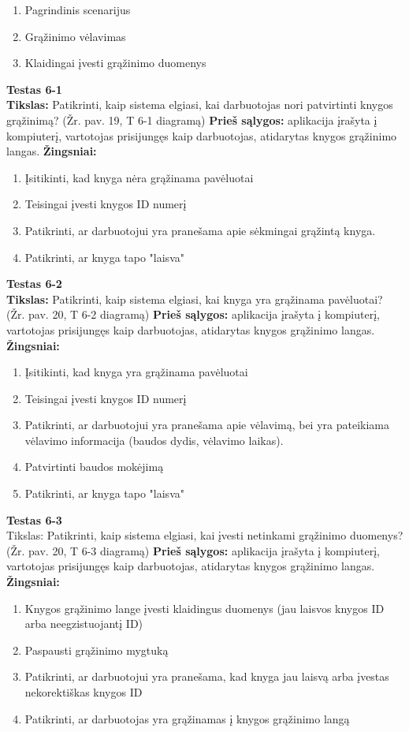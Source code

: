 \documentclass{VUMIFPSkursinis}
\begin{document}
\begin{enumerate}
\item Pagrindinis scenarijus
\item Grąžinimo vėlavimas
\item Klaidingai įvesti grąžinimo duomenys
\end{enumerate}
\hfill \break
\textbf{Testas 6-1}\\
\hfill \break
\textbf{Tikslas:} Patikrinti, kaip sistema elgiasi, kai darbuotojas nori patvirtinti knygos grąžinimą? (Žr. pav. 19, T 6-1 diagramą)
\hfill \break
\hfill \break
\textbf{Prieš sąlygos:} aplikacija įrašyta į kompiuterį, vartotojas prisijungęs kaip darbuotojas, atidarytas knygos grąžinimo langas.
\hfill \break
\hfill \break
\textbf{Žingsniai:}
\hfill \break
\begin{enumerate}
\item Įsitikinti, kad knyga nėra grąžinama pavėluotai
\item Teisingai įvesti knygos ID numerį
\item Patikrinti, ar darbuotojui yra pranešama apie sėkmingai grąžintą knyga.
\item Patikrinti, ar knyga tapo "laisva"
\end{enumerate}
\hfill \break
\textbf{Testas 6-2}\\
\hfill \break
\textbf{Tikslas:} Patikrinti, kaip sistema elgiasi, kai knyga yra grąžinama pavėluotai? (Žr. pav. 20, T 6-2 diagramą)
\hfill \break
\hfill \break
\textbf{Prieš sąlygos:} aplikacija įrašyta į kompiuterį, vartotojas prisijungęs kaip darbuotojas, atidarytas knygos grąžinimo langas.
\hfill \break
\hfill \break
\textbf{Žingsniai:}
\hfill \break
\begin{enumerate}
\item Įsitikinti, kad knyga yra grąžinama pavėluotai
\item Teisingai įvesti knygos ID numerį
\item Patikrinti, ar darbuotojui yra pranešama apie vėlavimą, bei yra pateikiama vėlavimo informacija (baudos dydis, vėlavimo laikas).
\item Patvirtinti baudos mokėjimą
\item Patikrinti, ar knyga tapo "laisva"
\end{enumerate}
\hfill \break
\textbf{Testas 6-3}\\
\hfill \break
Tikslas: Patikrinti, kaip sistema elgiasi, kai įvesti netinkami grąžinimo duomenys? (Žr. pav. 20, T 6-3 diagramą)
\hfill \break
\hfill \break
\textbf{Prieš sąlygos:} aplikacija įrašyta į kompiuterį, vartotojas prisijungęs kaip darbuotojas, atidarytas knygos grąžinimo langas.
\hfill \break
\hfill \break
\textbf{Žingsniai:}
\hfill \break
\begin{enumerate}
\item Knygos grąžinimo lange įvesti klaidingus duomenys (jau laisvos knygos ID arba neegzistuojantį ID)
\item Paspausti grąžinimo mygtuką
\item Patikrinti, ar darbuotojui yra pranešama, kad knyga jau laisvą arba įvestas nekorektiškas knygos ID
\item Patikrinti, ar darbuotojas yra grąžinamas į knygos grąžinimo langą
\end{enumerate}
\end{document}
